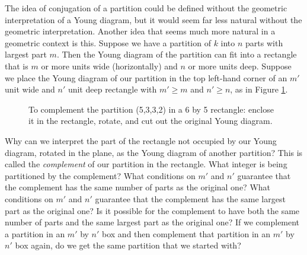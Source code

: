 {\item The idea of conjugation of a partition could be defined without the
geometric interpretation of a Young diagram, but it would seem far less
natural without the geometric interpretation.  Another idea that seems
much more natural in a geometric context is this.  Suppose we have a
partition of $k$ into $n$ parts with largest part $m$.  Then the Young
diagram of the partition can fit into a rectangle that is $m$ or more
units wide (horizontally) and $n$ or more units deep.  Suppose we place
the Young diagram of our partition in the top left-hand corner of an $m'$
unit wide and
$n'$ unit deep rectangle with $m'\ge m$ and $n' \ge n$, as in Figure
\ref{complementpartition}.
\begin{figure}[htb]\caption{To complement the partition
(5,3,3,2) in a 6 by 5 rectangle: enclose it in
the rectangle, rotate, and cut out the
original Young diagram.}\label{complementpartition}
\begin{center} \end{center}
\end{figure}  Why can we interpret the part of the rectangle
not occupied by our Young diagram, rotated in the
plane, as the Young diagram of another partition?  This is called the
{\em complement} of our partition in the
rectangle.  What integer is being partitioned by the complement?  What
conditions on
$m'$ and $n'$ guarantee that the complement has the same number of parts
as the original one?  What conditions on $m'$ and $n'$ guarantee that the
complement has the same largest part as the original one?  Is it possible
for the complement to have both the same number of parts and the same
largest part as the original one?  If we complement a partition in an
$m'$ by $n'$ box and then complement that partition in an $m'$ by $n'$
box again, do we get the same partition that we started
with?\label{rectanglecomplement}
}
